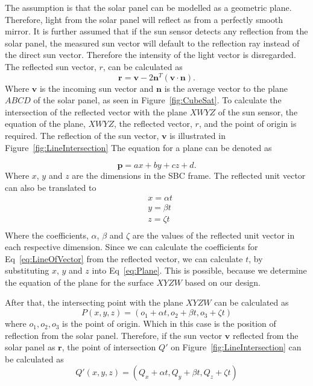 \documentclass[letterpaper, 10 pt, conference]{ieeeconf}  %
\begin{document}
The assumption is that the solar panel can be modelled as a geometric plane. Therefore, light from the solar panel will reflect as from a perfectly smooth mirror. It is further assumed that if the sun sensor detects any reflection from the solar panel, the measured sun vector will default to the reflection ray instead of the direct sun vector. Therefore the intensity of the light vector is disregarded. The reflected sun vector, $r$, can be calculated as
\begin{equation}
\mathbf{r} = \mathbf{v} - 2\mathbf{n}^T(\mathbf{v} \cdot \mathbf{n}).
\end{equation}
Where $\mathbf{v}$ is the incoming sun vector and $\mathbf{n}$ is the average vector to the plane $ABCD$ of the solar panel, as seen in Figure~\ref{fig:CubeSat}. To calculate the intersection of the reflected vector with the plane $XWYZ$ of the sun sensor, the equation of the plane, $XWYZ$, the reflected vector, $r$, and the point of origin is required. The reflection of the sun vector, $\mathbf{v}$ is illustrated in Figure~\ref{fig:LineIntersection} The equation for a plane can be denoted as

\begin{equation}
\mathbf{p} = ax + by + cz + d.
\label{eq:Plane}
\end{equation}
Where $x$, $y$ and $z$ are the dimensions in the SBC frame. The reflected unit vector can also be translated to 
\begin{equation}
\begin{aligned}
&	x = \alpha t \\
&	y = \beta t \\
&	z = \zeta t \\
\end{aligned}
\label{eq:LineOfVector}
\end{equation}
Where the coefficients, $\alpha$, $\beta$ and $\zeta$ are the values of the reflected unit vector in each respective dimension. Since we can calculate the coefficients for Eq~\ref{eq:LineOfVector} from the reflected vector, we can calculate $t$, by substituting $x$, $y$ and $z$ into Eq~\ref{eq:Plane}. This is possible, because we determine the equation of the plane for the surface $XYZW$ based on our design. 

After that, the intersecting point with the plane $XYZW$ can be calculated as
\begin{equation}
P(x, y, z) = (o_1 + \alpha t, o_2 + \beta t, o_3 + \zeta t)
\label{eq:Intersection}
\end{equation}
where $o_1, o_2, o_3$ is the point of origin. Which in this case is the position of reflection from the solar panel. Therefore, if the sun vector $\mathbf{v}$ reflected from the solar panel as $\mathbf{r}$, the point of intersection $Q'$ on Figure~\ref{fig:LineIntersection} can be calculated as
\begin{equation}
Q'(x, y, z) = (Q_x + \alpha t, Q_y + \beta t, Q_z + \zeta t)
\label{eq:SpecificIntersection}
\end{equation}
\end{document}
